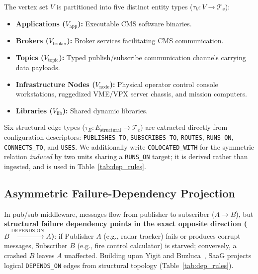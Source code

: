 \documentclass[sigconf,9pt]{acmart}
\begin{document}
The vertex set $V$ is partitioned into five distinct entity types ($\tau_V: V \to \mathcal{T}_v$):
\begin{itemize}\itemsep=0.5pt
    \item \textbf{Applications ($V_{\text{app}}$):} Executable CMS software binaries.
    \item \textbf{Brokers ($V_{\text{broker}}$):} Broker services facilitating CMS communication.
    \item \textbf{Topics ($V_{\text{topic}}$):} Typed publish/subscribe communication channels carrying data payloads.
    \item \textbf{Infrastructure Nodes ($V_{\text{node}}$):} Physical operator control console workstations, ruggedized VME/VPX server chassis, and mission computers.
    \item \textbf{Libraries ($V_{\text{lib}}$):} Shared dynamic libraries.
\end{itemize}

Six structural edge types ($\tau_E: E_{\text{structural}} \to \mathcal{T}_e$) are extracted directly from configuration descriptors: \texttt{PUBLISHES\_TO}, \texttt{SUBSCRIBES\_TO}, \texttt{ROUTES}, \texttt{RUNS\_ON}, \texttt{CONNECTS\_TO}, and \texttt{USES}. We additionally write \texttt{COLOCATED\_WITH} for the symmetric relation \emph{induced} by two units sharing a \texttt{RUNS\_ON} target; it is derived rather than ingested, and is used in Table~\ref{tab:dep_rules}.

\subsection{Asymmetric Failure-Dependency Projection}

In pub/sub middleware, messages flow from publisher to subscriber ($A \to B$), but \textbf{structural failure dependency points in the exact opposite direction ($B \xrightarrow{\text{DEPENDS\_ON}} A$)}: if Publisher $A$ (e.g., radar tracker) fails or produces corrupt messages, Subscriber $B$ (e.g., fire control calculator) is starved; conversely, a crashed $B$ leaves $A$ unaffected. Building upon Yigit and Buzluca~\cite{yigit2025graph}, SaaG projects logical \texttt{DEPENDS\_ON} edges from structural topology (Table~\ref{tab:dep_rules}).
\end{document}
